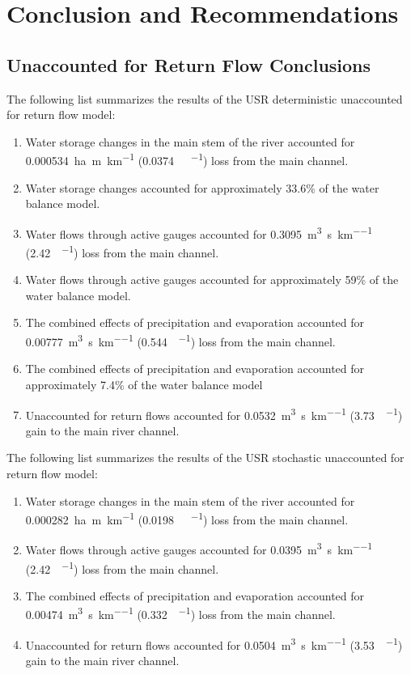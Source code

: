 \chapter{Conclusion and Recommendations}
\label{chap:Conclusion}

\section{Unaccounted for Return Flow Conclusions}
\label{sec:ReturnFlowConclusions}

The following list summarizes the results of the USR deterministic unaccounted for return flow model:
\begin{enumerate}
	\item Water storage changes in the main stem of the river accounted for \SI{0.000534}{\hectare\m\per\kilo\meter} (\SI{0.0374}{\acre\foot\per\mile}) loss from the main channel.
	\item Water storage changes accounted for approximately 33.6\% of the water balance model.
	\item Water flows through active gauges accounted for \SI{0.3095}{\cubic\m\per\second\per\kilo\meter} (\SI{2.42}{\cfs\per\mile}) loss from the main channel.
	\item Water flows through active gauges accounted for approximately 59\% of the water balance model.
	\item The combined effects of precipitation and evaporation accounted for \SI{0.00777}{\cubic\m\per\second\per\kilo\meter} (\SI{0.544}{\cfs\per\mile}) loss from the main channel.
	\item The combined effects of precipitation and evaporation accounted for approximately 7.4\% of the water balance model
	\item Unaccounted for return flows accounted for \SI{0.0532}{\cubic\m\per\second\per\kilo\meter} (\SI{3.73}{\cfs\per\mile}) gain to the main river channel.
\end{enumerate}

The following list summarizes the results of the USR stochastic unaccounted for return flow model:
\begin{enumerate}
	\item Water storage changes in the main stem of the river accounted for \SI{0.000282}{\hectare\m\per\kilo\meter} (\SI{0.0198}{\acre\foot\per\mile}) loss from the main channel.
	\item Water flows through active gauges accounted for \SI{0.0395}{\cubic\m\per\second\per\kilo\meter} (\SI{2.42}{\cfs\per\mile}) loss from the main channel.
	\item The combined effects of precipitation and evaporation accounted for \SI{0.00474}{\cubic\m\per\second\per\kilo\meter} (\SI{0.332}{\cfs\per\mile}) loss from the main channel.
	\item Unaccounted for return flows accounted for \SI{0.0504}{\cubic\m\per\second\per\kilo\meter} (\SI{3.53}{\cfs\per\mile}) gain to the main river channel.
\end{enumerate}

